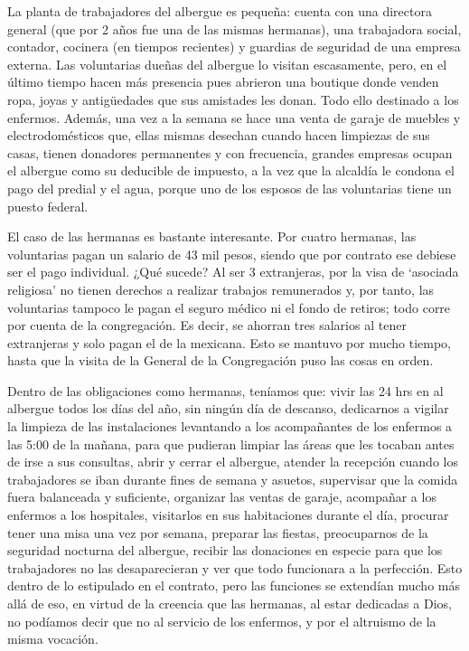 \documentclass[
  spanish,
  11pt,
  a4paper,
]{scrbook}
\begin{document}
La planta de trabajadores del albergue es pequeña: cuenta con una
directora general (que por 2 años fue una de las mismas hermanas), una
trabajadora social, contador, cocinera (en tiempos recientes) y guardias
de seguridad de una empresa externa. Las voluntarias dueñas del albergue
lo visitan escasamente, pero, en el último tiempo hacen más presencia
pues abrieron una boutique donde venden ropa, joyas y antigüedades que
sus amistades les donan. Todo ello destinado a los enfermos. Además, una
vez a la semana se hace una venta de garaje de muebles y
electrodomésticos que, ellas mismas desechan cuando hacen limpiezas de
sus casas, tienen donadores permanentes y con frecuencia, grandes
empresas ocupan el albergue como su deducible de impuesto, a la vez que
la alcaldía le condona el pago del predial y el agua, porque uno de los
esposos de las voluntarias tiene un puesto federal.

El caso de las hermanas es bastante interesante. Por cuatro hermanas,
las voluntarias pagan un salario de 43 mil pesos, siendo que por
contrato ese debiese ser el pago individual. ¿Qué sucede? Al ser 3
extranjeras, por la visa de `asociada religiosa' no tienen derechos a
realizar trabajos remunerados y, por tanto, las voluntarias tampoco le
pagan el seguro médico ni el fondo de retiros; todo corre por cuenta de
la congregación. Es decir, se ahorran tres salarios al tener extranjeras
y solo pagan el de la mexicana. Esto se mantuvo por mucho tiempo, hasta
que la visita de la General de la Congregación puso las cosas en orden.

Dentro de las obligaciones como hermanas, teníamos que: vivir las 24 hrs
en al albergue todos los días del año, sin ningún día de descanso,
dedicarnos a vigilar la limpieza de las instalaciones levantando a los
acompañantes de los enfermos a las 5:00 de la mañana, para que pudieran
limpiar las áreas que les tocaban antes de irse a sus consultas, abrir y
cerrar el albergue, atender la recepción cuando los trabajadores se iban
durante fines de semana y asuetos, supervisar que la comida fuera
balanceada y suficiente, organizar las ventas de garaje, acompañar a los
enfermos a los hospitales, visitarlos en sus habitaciones durante el
día, procurar tener una misa una vez por semana, preparar las fiestas,
preocuparnos de la seguridad nocturna del albergue, recibir las
donaciones en especie para que los trabajadores no las desaparecieran y
ver que todo funcionara a la perfección. Esto dentro de lo estipulado en
el contrato, pero las funciones se extendían mucho más allá de eso, en
virtud de la creencia que las hermanas, al estar dedicadas a Dios, no
podíamos decir que no al servicio de los enfermos, y por el altruismo de
la misma vocación.
\end{document}
